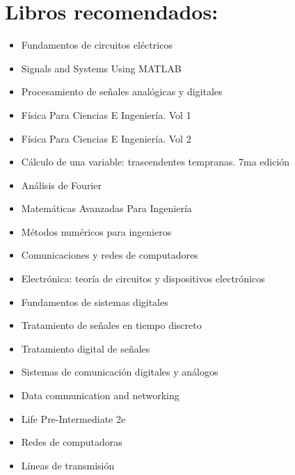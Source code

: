 \documentclass[
	12pt, %
	fleqn, %
	a4paper, %
	oneside, %
]{LegrandOrangeBook}
\begin{document}

\pagestyle{empty} %

\tableofcontents %

\cleardoublepage %

\pagestyle{fancy} %
\section*{Libros recomendados:}
\begin{itemize}
\item Fundamentos de circuitos eléctricos\cite{alexander2013fundamentos}
\item Signals and Systems Using MATLAB\cite{chaparro2018signals}
\item Procesamiento de señales analógicas y digitales\cite{ambardar1995analog}
\item Física Para Ciencias E Ingeniería. Vol 1\cite{serway2018fisica1}
\item Física Para Ciencias E Ingeniería. Vol 2\cite{serway2018fisica2}
\item Cálculo de una variable: trascendentes tempranas. 7ma edición \cite{stewart12calculo}
\item Análisis de Fourier\cite{hsu1998analisis}
\item Matemáticas Avanzadas Para Ingeniería\cite{o2014matematicas}
\item Métodos numéricos para ingenieros\cite{chapra2013metodos}
\item Comunicaciones y redes de computadores\cite{stallings2004comunicaciones}
\item Electrónica: teoría de circuitos y dispositivos electrónicos\cite{boylestad1989electronica}
\item Fundamentos de sistemas digitales\cite{floyd2006fundamentos}
\item Tratamiento de señales en tiempo discreto\cite{oppenheim2011tratamiento}
\item Tratamiento digital de señales\cite{proakis2007tratamiento}
\item Sistemas de comunicación digitales y análogos\cite{couchsistemas}
\item Data communication and networking\cite{forouzan2007data}
\item Life Pre-Intermediate 2e\cite{hughes2017life}
\item Redes de computadoras\cite{tanenbaum2012computer}
\item Líneas de transmisión\cite{velalineas1999}
\end{itemize}
\end{document}
